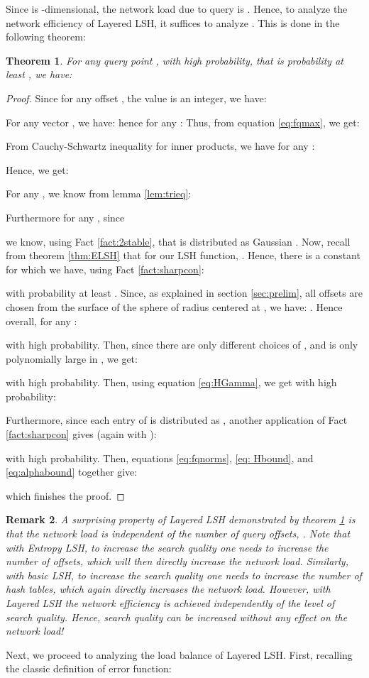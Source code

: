 \documentclass{acm_proc_article-sp}
\numberwithin{equation}{section}
\numberwithin{figure}{section}
\newtheorem{thm}{Theorem}
\newtheorem{rem}[thm]{Remark}
\newcommand{\algo}{Layered LSH}
\begin{document}
Since  is -dimensional, the network load due to query  is . Hence, to analyze the network efficiency of Layered LSH, it suffices to analyze . This is done in the following theorem:
\begin{thm} \label{thm:fq} For any query point , with high probability, that is probability at least , we have: 
\end{thm}
\begin{proof}
Since for any offset , the value  is an integer, we have: 

For any vector , we have:  hence for any : 
Thus, from equation \ref{eq:fqmax}, we get:

From Cauchy-Schwartz inequality for inner products, we have for any :

Hence, we get:

For any , we know from lemma \ref{lem:trieq}: 

Furthermore for any , since

we know, using Fact \ref{fact:2stable}, that  is distributed as Gaussian . Now, recall from theorem \ref{thm:ELSH} that for our LSH function, . Hence, there is a constant  for which we have, using Fact \ref{fact:sharpcon}: 

with probability at least . Since, as explained in section \ref{sec:prelim}, all offsets are chosen from the surface of the sphere  of radius  centered at , we have: . Hence overall, for any :

with high probability. Then, since there are only  different choices of , and  is only polynomially large in , we get:

with high probability. Then, using equation \ref{eq:HGamma}, we get with high probability:

Furthermore, since each entry of  is distributed as , another application of Fact \ref{fact:sharpcon} gives (again with ): 

with high probability. Then, equations \ref{eq:fqnorms}, \ref{eq: Hbound}, and \ref{eq:alphabound} together give:

which finishes the proof. 
\end{proof}
\begin{rem} A surprising property of Layered LSH demonstrated by theorem \ref{thm:fq} is that the network load is independent of the number of query offsets, . Note that with Entropy LSH, to increase the search quality one needs to increase the number of offsets, which will then directly increase the network load. Similarly, with basic LSH, to increase the search quality one needs to increase the number of hash tables, which again directly increases the network load. However, with Layered LSH the network efficiency is achieved independently of the level of search quality. Hence, search quality can be increased without any effect on the network load! 
\end{rem}
Next, we proceed to analyzing the load balance of \algo. First, recalling the classic definition of error function:
\end{document}
